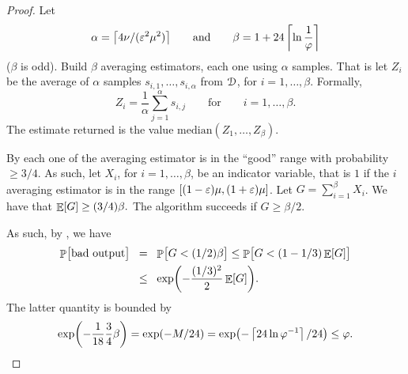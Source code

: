 \begin{proof}
    Let
    \begin{equation*}
        \alpha = \bigl\lceil{ {4 \nu}/(\eps^2\mu^2) } \bigr\rceil
        \qquad\text{and}\qquad%
        \beta = 1+24\ceil{ \ln \frac{1}{\BadProb}}
    \end{equation*}
    ($\beta$ is odd).
    Build $\beta$ averaging estimators, each one using $\alpha$ samples.  That is
    let $Z_i$ be the average of $\alpha$ samples
    $s_{i,1}, \ldots, s_{i, \alpha}$ from $\EuScript{D}$, for
    $i=1, \ldots, \beta$. Formally,
    \begin{equation*}
        Z_i = \frac{1}{\alpha} \sum_{j=1}^\alpha s_{i,j}
        \qquad
        \text{for}\qquad i=1,\ldots, \beta.
    \end{equation*}
    The estimate returned is the value
    $\mathrm{median}( Z_1, \ldots, Z_{\beta} )$.

    By  each one of the averaging estimator
    is in the ``good'' range with probability $\geq 3/4$. As such, let
    $X_i$, for $i=1,\ldots, \beta$, be an indicator variable, that is $1$ if the
    $i$\th averaging estimator is in the range
    $[(1-{\varepsilon})\mu,(1+{\varepsilon})\mu]$. Let $G = \sum_{i=1}^{\beta}X_i$. We have
    that
    \begin{math}
        \mathop{\mathbb{E}}\!\left[ {G} \right] \geq (3/4)\beta.
    \end{math}
    The algorithm succeeds if $G \geq \beta/2$.

    As such, by , we have
    \begin{align*}
        \Prob{\bigl. \text{bad output}}
        &\EQ%
        \Prob{\bigl.G < (1/2)\beta}
        \leq
        \Prob{\bigl.G < (1-1/3) \Ex{G}}
        \\
        &\LEQ
        \exp\pth{ - \frac{(1/3)^2}{2}\Ex{G}}.
    \end{align*}
    The latter quantity is bounded by
    \begin{equation*}
        \exp\pth{ - \frac{1}{18} \frac{3}{4} \beta} = \exp( -M/24)=
        \exp\pth{ - \ceil{24 \ln \BadProb^{-1}} /24 } \leq%
        \BadProb.
    \end{equation*}
\end{proof}




